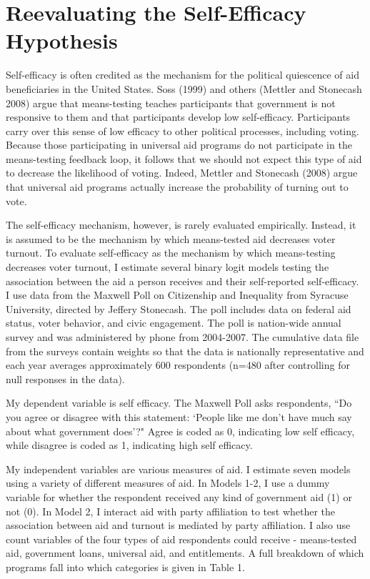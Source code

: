 \documentclass[12pt]{paper}
\begin{document}
\section{Reevaluating the Self-Efficacy Hypothesis}
Self-efficacy is often credited as the mechanism for the political quiescence of aid beneficiaries in the United States. Soss (1999) and others (Mettler and Stonecash 2008) argue that means-testing teaches participants that government is not responsive to them and that participants develop low self-efficacy. Participants carry over this sense of low efficacy to other political processes, including voting. Because those participating in universal aid programs do not participate in the means-testing feedback loop, it follows that we should not expect this type of aid to decrease the likelihood of voting. Indeed, Mettler and Stonecash (2008) argue that universal aid programs actually increase the probability of turning out to vote. 

The self-efficacy mechanism, however, is rarely evaluated empirically. Instead, it is assumed to be the mechanism by which means-tested aid decreases voter turnout. To evaluate self-efficacy as the mechanism by which means-testing decreases voter turnout, I estimate several binary logit models testing the association between the aid a person receives and their self-reported self-efficacy. I use data from the Maxwell Poll on Citizenship and Inequality from Syracuse University, directed by Jeffery Stonecash. The poll includes data on federal aid status, voter behavior, and civic engagement. The poll is nation-wide annual survey and was administered by phone from 2004-2007. The cumulative data file from the surveys contain weights so that the data is nationally representative and each year averages approximately 600 respondents (n=480 after controlling for null responses in the data).

My dependent variable is self efficacy. The Maxwell Poll asks respondents, ``Do you agree or disagree with this statement: `People like me don’t have much say about what government does'?" Agree is coded as 0, indicating low self efficacy, while disagree is coded as 1, indicating high self efficacy.

My independent variables are various measures of aid. I estimate seven models using a variety of different measures of aid. In Models 1-2, I use a dummy variable for whether the respondent received any kind of government aid (1) or not (0). In Model 2, I interact aid with party affiliation to test whether the association between aid and turnout is mediated by party affiliation. I also use count variables of the four types of aid respondents could receive - means-tested aid, government loans, universal aid, and entitlements. A full breakdown of which programs fall into which categories is given in Table 1.
\end{document}
